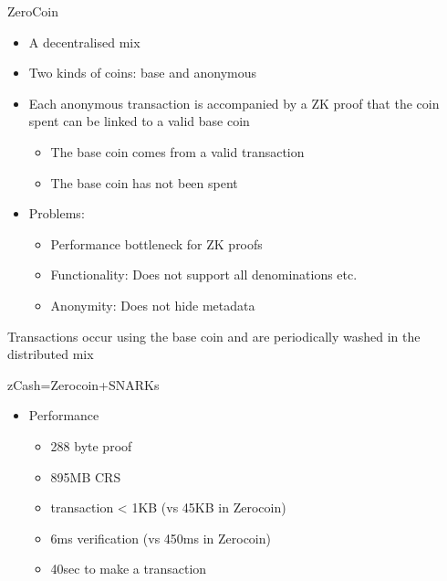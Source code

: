\documentclass[handouts]{beamer}
\begin{document}
\begin{frame}{ZeroCoin}
    \begin{itemize} 
    \item A decentralised mix \pause
    \item Two kinds of coins: base and anonymous \pause
    \item Each anonymous transaction is accompanied by a ZK proof that the coin spent can be linked to a valid base coin \pause
    \begin{itemize} 
        \item The base coin comes from a valid transaction \pause
        \item The base coin has not been spent \pause
    \end{itemize}
    \item Problems:
        \begin{itemize}
            \item Performance bottleneck for ZK proofs \pause
            \item Functionality: Does not support all denominations etc. \pause
            \item Anonymity: Does not hide metadata
        \end{itemize}
    \end{itemize}
    \item Transactions occur using the base coin and are periodically washed in the distributed mix
\end{frame}

\begin{frame}{zCash=Zerocoin+SNARKs}
    \begin{itemize}
        \item Performance
        \begin{itemize}
            \begin{itemize}
                 \item 288 byte proof \pause
                 \item 895MB CRS \pause
                 \item transaction < 1KB (vs 45KB in Zerocoin) \pause
                 \item 6ms verification (vs 450ms in Zerocoin) \pause
                 \item 40sec to make a transaction
            \end{itemize}
        \end{itemize}
    \end{itemize}
\end{frame}
\end{document}
